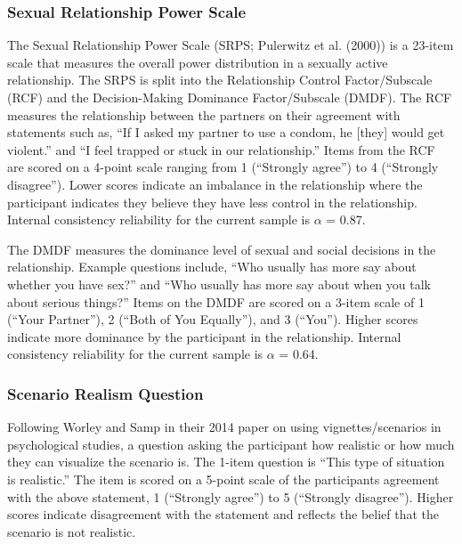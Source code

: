 \documentclass[
  english,
  a4paper,floatsintext]{apa7}
\begin{document}
\hypertarget{sexual-relationship-power-scale}{%
\subsubsection{Sexual Relationship Power Scale}\label{sexual-relationship-power-scale}}

The Sexual Relationship Power Scale (SRPS; Pulerwitz et al. (2000)) is a 23-item scale that measures the overall power distribution in a sexually active relationship. The SRPS is split into the Relationship Control Factor/Subscale (RCF) and the Decision-Making Dominance Factor/Subscale (DMDF). The RCF measures the relationship between the partners on their agreement with statements such as, ``If I asked my partner to use a condom, he {[}they{]} would get violent.'' and ``I feel trapped or stuck in our relationship.'' Items from the RCF are scored on a 4-point scale ranging from 1 (``Strongly agree'') to 4 (``Strongly disagree''). Lower scores indicate an imbalance in the relationship where the participant indicates they believe they have less control in the relationship. Internal consistency reliability for the current sample is \(\alpha\) = 0.87.

The DMDF measures the dominance level of sexual and social decisions in the relationship. Example questions include, ``Who usually has more say about whether you have sex?'' and ``Who usually has more say about when you talk about serious things?'' Items on the DMDF are scored on a 3-item scale of 1 (``Your Partner''), 2 (``Both of You Equally''), and 3 (``You''). Higher scores indicate more dominance by the participant in the relationship. Internal consistency reliability for the current sample is \(\alpha\) = 0.64.

\hypertarget{scenario-realism-question}{%
\subsubsection{Scenario Realism Question}\label{scenario-realism-question}}

Following Worley and Samp in their 2014 paper on using vignettes/scenarios in psychological studies, a question asking the participant how realistic or how much they can visualize the scenario is. The 1-item question is ``This type of situation is realistic.'' The item is scored on a 5-point scale of the participants agreement with the above statement, 1 (``Strongly agree'') to 5 (``Strongly disagree''). Higher scores indicate disagreement with the statement and reflects the belief that the scenario is not realistic.
\end{document}
